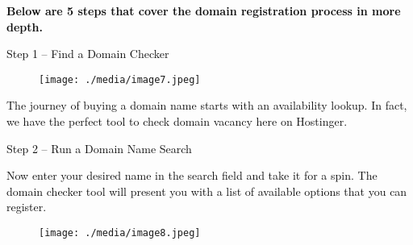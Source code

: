 \documentclass[12pt]{report}
\renewcommand{\_}{\kern-1.5pt\textunderscore\kern-1.5pt}
\begin{document}
\begin{itemize}
\vspace{\baselineskip} \tabto{0.59in} \textbf{\textcolor[HTML]{0D0D0D}{Below are 5 steps that cover the domain registration process in more depth.}}\par


\vspace{\baselineskip} \tabto{0.59in} \textcolor[HTML]{0D0D0D}{Step 1 – Find a Domain Checker}\par




\begin{figure}[H]
\advance\leftskip 2.27in		\texttt{[image: ./media/image7.jpeg]}
\end{figure}



\textcolor[HTML]{0D0D0D}{The journey of buying a domain name starts with an availability lookup. In fact, we have the perfect tool to check domain vacancy here on Hostinger.}\par


\vspace{\baselineskip}
\vspace{\baselineskip} \tabto{0.59in} \textcolor[HTML]{0D0D0D}{Step 2 – Run a Domain Name Search}\par

 \tabto{0.59in} \textcolor[HTML]{0D0D0D}{Now enter your desired name in the search field and take it for a spin. The domain checker tool will present you with a list of available options that you can register.}\par


\vspace{\baselineskip}


\begin{figure}[H]
	\begin{Center}
		\texttt{[image: ./media/image8.jpeg]}
	\end{Center}
\end{figure}



\par



\end{itemize}
\end{document}
